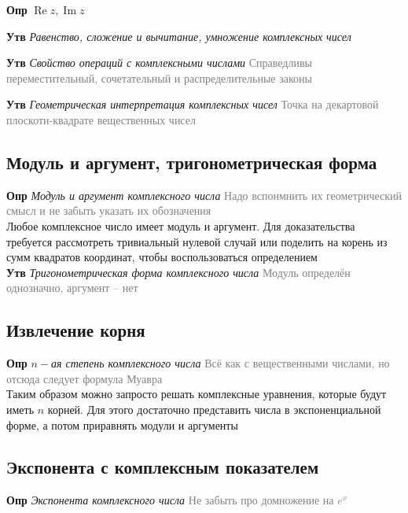 \documentclass[a4paper, 14pt]{article}
\begin{document}
    \textbf{Опр} \textit{$\operatorname{Re}z, \operatorname{Im}z$}

    \textbf{Утв} \textit{Равенство, сложение и вычитание, умножение комплексных чисел}

    \textbf{Утв} \textit{Свойство операций с комплексными числами} \textcolor{gray}{Справедливы переместительный,
        сочетательный и распределительные законы}

    \textbf{Утв} \textit{Геометрическая интерпретация комплексных чисел} \textcolor{gray}{Точка на декартовой
    плоскоти-квадрате вещественных чисел}

    \subsection{Модуль и аргумент, тригонометрическая форма}

    \textbf{Опр} \textit{Модуль и аргумент комплексного числа} \textcolor{gray}{Надо вспонмнить их геометрический
    смысл и не забыть указать их обозначения} \\

    Любое комплексное число имеет модуль и аргумент.
    Для доказательства требуется рассмотреть тривиальный нулевой
    случай или поделить на корень из сумм квадратов координат, чтобы воспользоваться определением \\

    \textbf{Утв} \textit{Тригонометрическая форма комплексного числа} \textcolor{gray}{Модуль определён однозначно,
        аргумент -- нет}

    \subsection{Извлечение корня}

    \textbf{Опр} \textit{$n-$ая степень комплексного числа} \textcolor{gray}{Всё как с вещественными числами, но
    отсюда следует формула Муавра} \\

    Таким образом можно запросто решать комплексные уравнения, которые будут иметь $n$ корней.
    Для этого достаточно
    представить числа в экспоненциальной форме, а потом приравнять модули и аргументы

    \subsection{Экспонента с комплексным показателем}

    \textbf{Опр} \textit{Экспонента комплексного числа} \textcolor{gray}{Не забыть про домножение на $e^x$}
\end{document}
